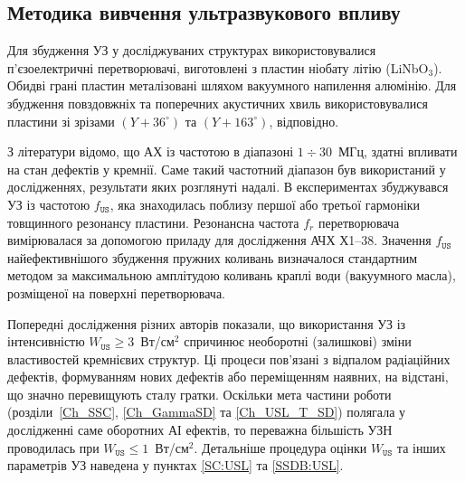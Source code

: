 \subsection{Методика вивчення ультразвукового впливу}

Для збудження УЗ у досліджуваних структурах використовувалися п'єзоелектричні перетворювачі,
виготовлені з пластин ніобату літію (LiNbO$_3$).
Обидві грані пластин металізовані шляхом вакуумного напилення алюмінію.
Для збудження повздовжніх та поперечних акустичних хвиль використовувалися пластини зі зрізами $(Y\!+\!36^\circ)$ та $(Y\!+\!163^\circ)$, відповідно.

З літератури \cite{Ostapenko1995,Davletova2008,Davletova2009,Pashaev2014r} відомо, що АХ із частотою в діапазоні $1\div30$~МГц, здатні впливати на стан дефектів у кремнії.
Саме такий частотний діапазон був використаний у дослідженнях, результати яких розглянуті надалі.
В експериментах збуджувався УЗ із частотою $f_\mathtt{US}$, яка знаходилась поблизу першої або третьої гармоніки товщинного резонансу пластини.
Резонансна частота $f_r$ перетворювача вимірювалася за допомогою приладу для дослідження АЧХ Х1--38.
Значення $f_\mathtt{US}$ найефективнішого збудження пружних коливань визначалося стандартним методом за максимальною амплітудою коливань краплі води (вакуумного масла), розміщеної на поверхні перетворювача.

Попередні дослідження різних авторів \cite{Davletova2008,Davletova2009,Pashaev2014r,Vlasov2009r} показали, що використання УЗ
із інтенсивністю $W_\mathtt{US}\geq3$~Вт/см$^2$ спричинює необоротні (залишкові) зміни властивостей кремнієвих структур.
Ці процеси пов'язані з відпалом радіаційних дефектів, формуванням нових дефектів або переміщенням наявних, на відстані, що значно перевищують сталу гратки.
Оскільки мета частини роботи (розділи~\ref{Ch_SSC}, \ref{Ch_GammaSD} та \ref{Ch_USL_T_SD}) полягала у дослідженні саме оборотних АІ ефектів,
то переважна більшість УЗН проводилась при $W_\mathtt{US} \leq 1$~Вт/см$^2$.
Детальніше процедура оцінки $W_\mathtt{US}$ та інших параметрів УЗ наведена у пунктах \ref{SC:USL} та \ref{SSDB:USL}.



